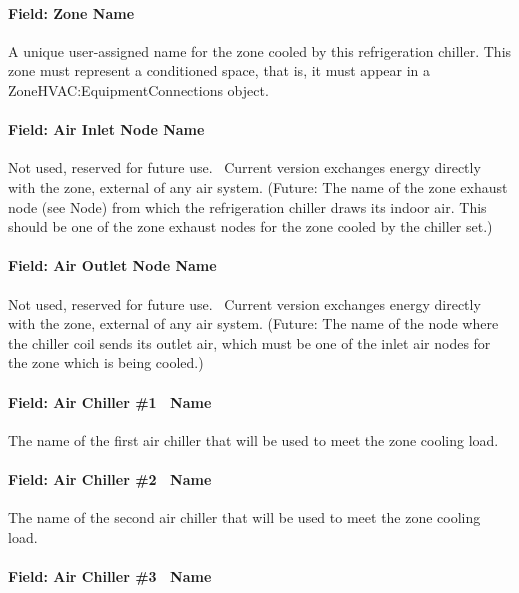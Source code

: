 \paragraph{Field: Zone Name}\label{field-zone-name-1-011}

A unique user-assigned name for the zone cooled by this refrigeration chiller. This zone must represent a conditioned space, that is, it must appear in a ZoneHVAC:EquipmentConnections object.

\paragraph{Field: Air Inlet Node Name}\label{field-air-inlet-node-name-7-000}

Not used, reserved for future use.~ Current version exchanges energy directly with the zone, external of any air system. (Future: The name of the zone exhaust node (see Node) from which the refrigeration chiller draws its indoor air. This should be one of the zone exhaust nodes for the zone cooled by the chiller set.)

\paragraph{Field: Air Outlet Node Name}\label{field-air-outlet-node-name-7-001}

Not used, reserved for future use.~ Current version exchanges energy directly with the zone, external of any air system. (Future: The name of the node where the chiller coil sends its outlet air, which must be one of the inlet air nodes for the zone which is being cooled.)

\paragraph{Field: Air Chiller \#1 ~Name}\label{field-air-chiller-1-name}

The name of the first air chiller that will be used to meet the zone cooling load.

\paragraph{Field: Air Chiller \#2 ~Name}\label{field-air-chiller-2-name}

The name of the second air chiller that will be used to meet the zone cooling load.

\paragraph{Field: Air Chiller \#3 ~Name}\label{field-air-chiller-3-name}

